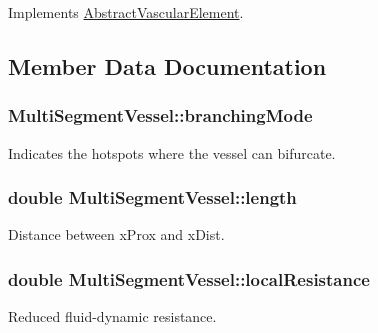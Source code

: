 Implements \hyperlink{class_abstract_vascular_element_a258a830359614d0217e820293a9bdaa9}{Abstract\+Vascular\+Element}.



\subsection{Member Data Documentation}
\subsubsection[{\texorpdfstring{branching\+Mode}{branchingMode}}]{ Multi\+Segment\+Vessel\+::branching\+Mode}\hypertarget{class_multi_segment_vessel_a238ef13a0d4d9f9fb6e4bf2979386cb9}{}\label{class_multi_segment_vessel_a238ef13a0d4d9f9fb6e4bf2979386cb9}
Indicates the hotspots where the vessel can bifurcate. 
\subsubsection[{\texorpdfstring{length}{length}}]{\setlength{\rightskip}{0pt plus 5cm}double Multi\+Segment\+Vessel\+::length}\hypertarget{class_multi_segment_vessel_a512959b16b5fd0e2122a920eafe7cf0f}{}\label{class_multi_segment_vessel_a512959b16b5fd0e2122a920eafe7cf0f}
Distance between x\+Prox and x\+Dist. 
\subsubsection[{\texorpdfstring{local\+Resistance}{localResistance}}]{\setlength{\rightskip}{0pt plus 5cm}double Multi\+Segment\+Vessel\+::local\+Resistance}\hypertarget{class_multi_segment_vessel_a31fbf5ebdd353727814fc4ec83600e6a}{}\label{class_multi_segment_vessel_a31fbf5ebdd353727814fc4ec83600e6a}
Reduced fluid-\/dynamic resistance. 
